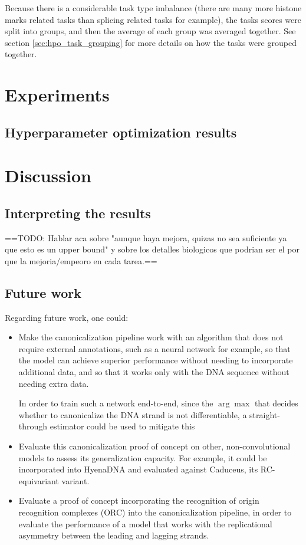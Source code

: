 \documentclass[   ]{article}
\begin{document}
Because there is a considerable task type imbalance (there are many more histone marks related tasks than splicing related tasks for example), the tasks scores were split into groups, and then the average of each group was averaged together. See section \ref{sec:hpo_task_grouping} for more details on how the tasks were grouped together.

\section{Experiments}

\subsection{Hyperparameter optimization results}
\label{sec:hyperparameter-optimization-results}

\section{Discussion}
\subsection{Interpreting the results}
==TODO: Hablar aca sobre "aunque haya mejora, quizas no sea suficiente ya que esto es un upper bound" y sobre los detalles biologicos que podrian ser el por que la mejoria/empeoro en cada tarea.==

\subsection{Future work}
Regarding future work, one could:
\begin{itemize}
	\item Make the
	canonicalization pipeline work with an algorithm that does not require
	external annotations, such as a neural network for example, so that the
	model can achieve superior performance without needing to incorporate
	additional data, and so that it works only with the DNA sequence without
	needing extra data.
	
	In order to train such a network end-to-end, since the \(\arg\max\) that
	decides whether to canonicalize the DNA strand is not differentiable, a
	straight-through estimator could be used to mitigate this
	\citep{bengioEstimatingPropagatingGradients2013}

	\item Evaluate this canonicalization proof
	of concept on other, non-convolutional models to assess its
	generalization capacity. For example, it could be incorporated into
	HyenaDNA and evaluated against Caduceus, its RC-equivariant variant.
	\item Evaluate a proof of concept incorporating the recognition of origin
	recognition complexes (ORC) into the canonicalization pipeline, in order
	to evaluate the performance of a model that works with the replicational
	asymmetry between the leading and lagging strands.
\end{itemize}
\end{document}
